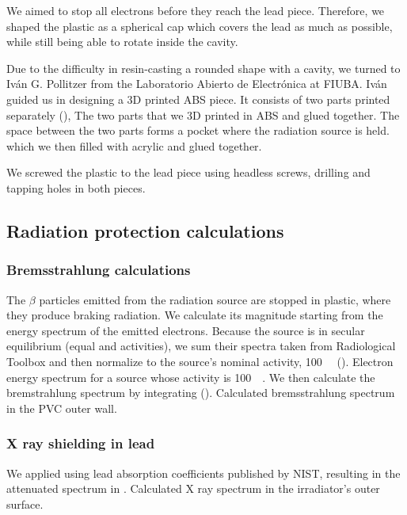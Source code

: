 We aimed to stop all electrons before they reach the lead piece.
Therefore, we shaped the plastic as a spherical cap which covers
the lead as much as possible,
while still being able to rotate inside the cavity.

Due to the difficulty in resin-casting a rounded shape with a cavity,
we turned to Iván G. Pollitzer from the
Laboratorio Abierto de Electrónica at FIUBA.
Iván guided us in designing a 3D printed ABS piece.
It consists of two parts printed separately
(),
{The two parts that we 3D printed in ABS and glued together.
The space between the two parts forms a pocket where the radiation source is held.}
which we then filled with acrylic and glued together.

We screwed the plastic to the lead piece using headless screws,
drilling and tapping holes in both pieces.
\subsection{Radiation protection calculations}
%
\subsubsection{Bremsstrahlung calculations}
The $\beta$ particles emitted from the radiation source are stopped in plastic,
where they produce braking radiation.
We calculate its magnitude starting from the energy spectrum of the emitted electrons.
Because the source is in secular equilibrium (equal \Strontium and \Yttrium activities),
we sum their spectra taken from
Radiological Toolbox\cite{eckerman2006radiological}
and then normalize to the source's nominal activity, \SI{100}{\milli\curie}
().
{Electron energy spectrum for a
\Strontium source whose activity is \SI{100}{\milli\curie}\cite{eckerman_icrp_2007}.}
We then calculate the bremstrahlung spectrum by integrating 
().
{Calculated bremsstrahlung spectrum in the PVC outer wall.}
%
\subsubsection{X ray shielding in lead}
We applied  
using lead absorption coefficients published by NIST\cite{xraycoef},
resulting in the attenuated spectrum in .
{Calculated X ray spectrum in the irradiator's outer surface.}
%
%
